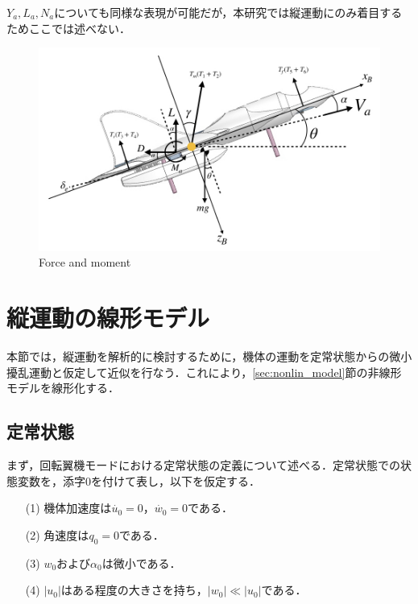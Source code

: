 $Y_a,L_a,N_a$についても同様な表現が可能だが，本研究では縦運動にのみ着目するためここでは述べない．


\begin{figure}[H]
	\centering
	\includegraphics[clip,width=15.0cm,bb=0 0 940 560]{./z_figure_files/chapter3/6_xz_force.jpeg}
	\caption{Force and moment}
	\label{fig:xz_force}
\end{figure}

\section{縦運動の線形モデル}
本節では，縦運動を解析的に検討するために，機体の運動を定常状態からの微小擾乱運動と仮定して近似を行なう．これにより，\ref{sec:nonlin_model}節の非線形モデルを線形化する．

\subsection{定常状態}
\label{sec:steady}

まず，回転翼機モードにおける定常状態の定義について述べる．定常状態での状態変数を，添字0を付けて表し，以下を仮定する．
	\begin{itemize}
	\item[(1)]機体加速度は$\dot{u_0} = 0$，$\dot{w_0} = 0$である．
	\item[(2)]角速度は$q_0 = 0$である．
  \item[(3)]$w_0$および$\alpha_0$は微小である．
  \item[(4)]$|u_0|$はある程度の大きさを持ち，$|w_0|\ll|u_0|$である．
	\end{itemize}

